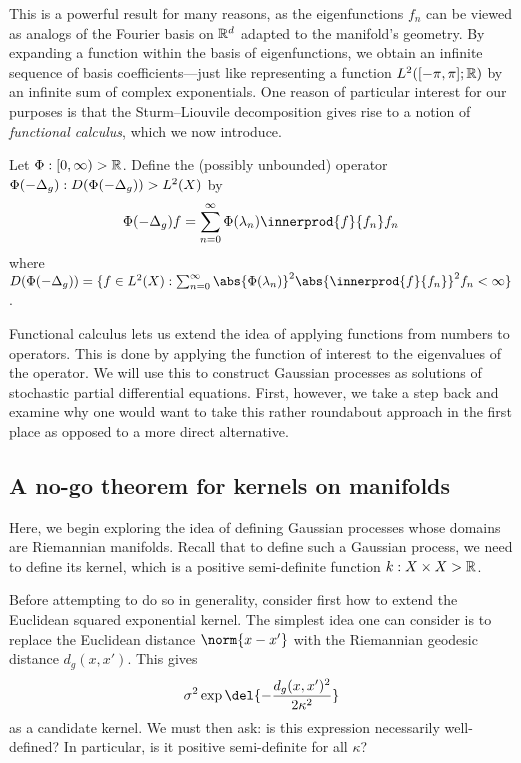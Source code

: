 \documentclass[11pt]{book}
\begin{document}
This is a powerful result for many reasons, as the eigenfunctions $f_n$ can be viewed as analogs of the Fourier basis  on $\mathbb{R}^d$ adapted to the manifold's geometry.
By expanding a function within the basis of eigenfunctions, we obtain an infinite sequence of basis coefficients---just like representing a function $L^2([-\pi,\pi];\mathbb{R})$ by an infinite sum of complex exponentials.
One reason of particular interest for our purposes is that the Sturm--Liouvile decomposition gives rise to a notion of \emph{functional calculus}, which we now introduce.

\begin{definition}
Let $\Phi : [0,\infty) \-> \mathbb{R}$. 
Define the (possibly unbounded) operator $\Phi(-\Delta_g) : D(\Phi(-\Delta_g)) \-> L^2(X)$ by
\[
\Phi(-\lap_g) f = \sum_{n=0}^\infty \Phi(\lambda_n) \innerprod{f}{f_n} f_n
\]
where $D(\Phi(-\lap_g)) = \{f \in L^2(X) : \sum_{n=0}^\infty \abs{\Phi(\lambda_n)}^2 \abs{\innerprod{f}{f_n}}^2 f_n < \infty\}$.
\end{definition}

Functional calculus lets us extend the idea of applying functions from numbers to operators.
This is done by applying the function of interest to the eigenvalues of the operator.
We will use this to construct Gaussian processes as solutions of stochastic partial differential equations.
First, however, we take a step back and examine why one would want to take this rather roundabout approach in the first place as opposed to a more direct alternative.

\subsection{A no-go theorem for kernels on manifolds}

Here, we begin exploring the idea of defining Gaussian processes whose domains are Riemannian manifolds.
Recall that to define such a Gaussian process, we need to define its kernel, which is a positive semi-definite function $k : X \times X \-> \mathbb{R}$.

Before attempting to do so in generality, consider first how to extend the Euclidean squared exponential kernel.
The simplest idea one can consider is to replace the Euclidean distance $\norm{x-x'}$ with the Riemannian geodesic distance $d_g(x,x')$.
This gives 
\[
\sigma^2 \exp\del{-\frac{d_g(x,x')^2}{2\kappa^2}}
\]
as a candidate kernel.
We must then ask: is this expression necessarily well-defined? 
In particular, is it positive semi-definite for all $\kappa$?
\end{document}
